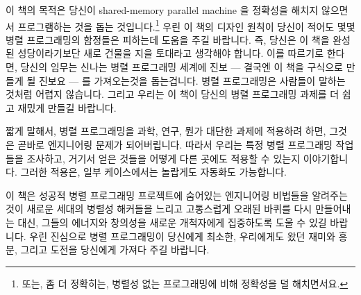 

이 책의 목적은 당신이 shared-memory parallel machine 을 정확성을 해치지
않으면서 프로그램하는 것을 돕는 것입니다.\footnote{또는, 좀 더 정확히는, 병렬성
없는 프로그래밍에 비해 정확성을 덜 해치면서요.} 우린 이 책의 디자인 원칙이
당신이 적어도 몇몇 병렬 프로그래밍의 함정들은 피하는데 도움을 주길 바랍니다.
즉, 당신은 이 책을 완성된 성당이라기보단 새로 건물을 지을 토대라고 생각해야
합니다.  이를 따르기로 한다면, 당신의 임무는 신나는 병렬 프로그래밍 세계에 진보
--- 결국엔 이 책을 구식으로 만들게 될 진보요 --- 를 가져오는것을 돕는겁니다.
병렬 프로그래밍은 사람들이 말하는 것처럼 어렵지 않습니다. 그리고 우리는 이 책이
당신의 병렬 프로그래밍 과제를 더 쉽고 재밌게 만들길 바랍니다.


짧게 말해서, 병렬 프로그래밍을 과학, 연구, 뭔가 대단한 과제에 적용하려 하면,
그것은 곧바로 엔지니어링 문제가 되어버립니다.  따라서 우리는 특정 병렬
프로그래밍 작업들을 조사하고, 거기서 얻은 것들을 어떻게 다른 곳에도 적용할 수
있는지 이야기합니다.  그러한 적용은, 일부 케이스에서는 놀랍게도 자동화도
가능합니다.


이 책은 성공적 병렬 프로그래밍 프로젝트에 숨어있는 엔지니어링 비법들을 알려주는
것이 새로운 세대의 병렬성 해커들을 느리고 고통스럽게 오래된 바퀴를 다시
만들어내는 대신, 그들의 에너지와 창의성을 새로운 개척자에게 집중하도록 도울 수
있길 바랍니다.
우린 진심으로 병렬 프로그래밍이 당신에게 최소한, 우리에게도 왔던 재미와 흥분,
그리고 도전을 당신에게 가져다 주길 바랍니다.

